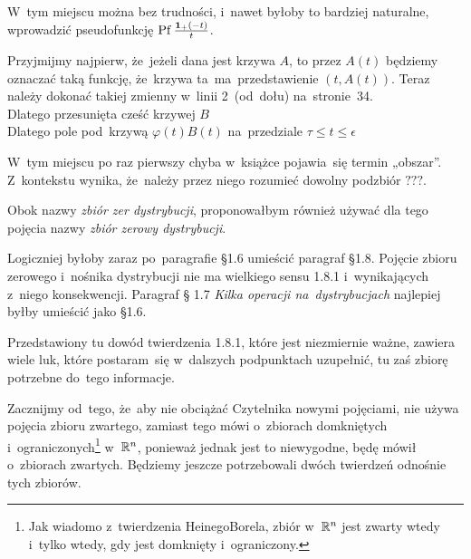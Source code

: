 \documentclass[a4paper,11pt]{article}
\begin{document}
\vspace{\spaceFour}



\start {} W~tym miejscu można bez trudności, i~nawet byłoby to
bardziej naturalne, wprowadzić pseudofunkcję
$\mathrm{Pf}\, \frac{ \mathbf{1}_{ + }( -t )}{ t }$.

\vspace{\spaceFour}



\start {} Przyjmijmy najpierw, że~jeżeli dana jest krzywa
$A$, to przez $A( t )$ będziemy oznaczać taką funkcję, że~krzywa
ta~ma~przedstawienie $( t, A( t ) )$. Teraz należy dokonać takiej
zmienny w~linii 2~(od~dołu) na~stronie~34. \\
\Jest  Dlatego przesunięta cześć krzywej $B$ \\
\Powin Dlatego pole pod~krzywą $\varphi( t ) B( t )$ na~przedziale
$\tau \leq t \leq \epsilon$

\vspace{\spaceFour}



\start {} W~tym miejscu po raz pierwszy chyba w~książce
pojawia~się termin „obszar”. Z~kontekstu wynika, że~należy przez
niego rozumieć dowolny podzbiór $???$.

\vspace{\spaceFour}



\start {} Obok nazwy \textit{zbiór zer dystrybucji}, proponowałbym
również używać dla tego pojęcia nazwy \textit{zbiór zerowy dystrybucji}.

\vspace{\spaceFour}


\start {} Logiczniej byłoby zaraz po~paragrafie \S 1.6 umieścić
paragraf \S 1.8. Pojęcie zbioru zerowego i~nośnika dystrybucji nie ma
wielkiego sensu 1.8.1 i~wynikających z~niego konsekwencji. Paragraf \S
1.7 \textit{Kilka operacji na~dystrybucjach} najlepiej byłby umieścić
jako \S 1.6.

\vspace{\spaceFour}



\start {} Przedstawiony tu dowód twierdzenia 1.8.1, które
jest niezmiernie ważne, zawiera wiele luk, które postaram~się
w~dalszych podpunktach uzupełnić, tu zaś zbiorę potrzebne do~tego
informacje.

Zacznijmy od~tego, że~aby nie obciążać Czytelnika nowymi pojęciami,
nie używa pojęcia zbioru zwartego, zamiast tego mówi o~zbiorach
domkniętych i~ograniczonych\footnote{Jak wiadomo z~twierdzenia
  Heinego\dywiz Borela, zbiór w~$\mathbb{R}^{ n }$ jest zwarty wtedy i~tylko
  wtedy, gdy jest domknięty i~ograniczony.} w~$\mathbb{R}^{ n }$, ponieważ jednak jest to
niewygodne, będę mówił o~zbiorach zwartych. Będziemy jeszcze
potrzebowali dwóch twierdzeń odnośnie tych zbiorów.
\end{document}
